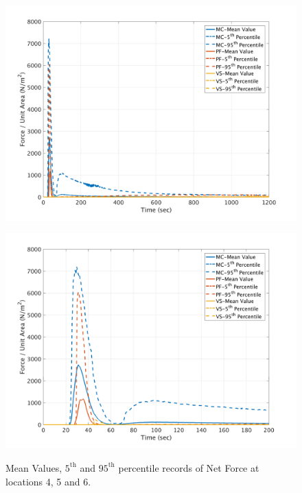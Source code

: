 \documentclass[a4paper,10pt]{article}
\begin{document}
\begin{figure}[H]
	\begin{minipage}[b]{0.5\linewidth}
	\centering
    \includegraphics[width=1\textwidth]{NetFAll/NetF6All.png}     
        \label{fig:NF6}
	\end{minipage}
	\begin{minipage}[b]{0.5\linewidth}
	\centering
    \includegraphics[width=1\textwidth]{NetFAll/NetF6All_z.png}
        \label{fig:NF6zoom}
	\end{minipage}
	
	\caption{Mean Values, $5^{\mathrm{th}}$ and $95^{\mathrm{th}}$ percentile records of Net Force at locations 4, 5 and 6.}\label{fig:NF456}	
\end{figure}
\end{document}
